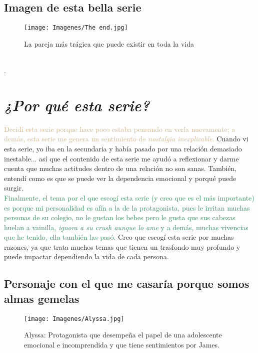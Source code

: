 \documentclass[A5,11pt]{article}
\begin{document}
    \subsection{Imagen de esta bella serie }
        \begin{figure}[h]\raggedleft
            \texttt{[image: Imagenes/The end.jpg]}
            \caption*{La pareja más trágica que puede existir en toda la vida}
        \end{figure}
    
    \\ .
    \\
    
    
    
         
\section{\emph{¿Por qué esta serie?}}
    \textcolor{Tan}{Decidí esta serie porque hace poco estaba pensando en verla nuevamente; a demás, esta serie me genera un sentimiento de \emph{nostalgia inexplicable}.} 
    \textcolor{BrickRed}{Cuando vi esta serie, yo iba en la secundaria y había pasado por una relación demasiado inestable... así que el contenido de esta serie me ayudó a reflexionar y darme cuenta que muchas actitudes dentro de una relación no son sanas. También, entendí como es que se puede ver la dependencia emocional y porqué puede surgir. }\\
    \textcolor{SeaGreen}{Finalmente, el tema por el que escogí esta serie (y creo que es el más importante) es porque mi personalidad es afín a la de la protagonista, pues le irritan muchas personas de su colegio, no le gustan los bebes pero le gusta que sus cabezas huelan a vainilla, \emph{ignora a su crush aunque lo ame} y a demás, muchas vivencias que he tenido, ella también las pasó.} Creo que escogí esta serie por muchas razones, ya que trata muchos temas que tienen un trasfondo muy profundo y puede impactar dependiendo la vida de cada persona.  
    
    \subsection{Personaje con el que me casaría porque somos almas gemelas}
        \begin{SCfigure}[1][h]
            \texttt{[image: Imagenes/Alyssa.jpg]}
            \caption{ Alyssa: Protagonista que desempeña el papel de          una adolescente emocional e incomprendida y que          tiene sentimientos por James.}
        \end{SCfigure}
        
\end{document}
